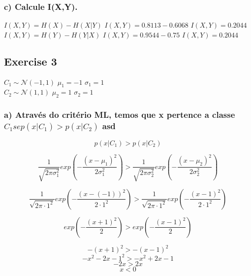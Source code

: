 \documentclass[a4paper]{article}
\begin{document}
\subsubsection{c) Calcule I(X,Y).}

$ I(X,Y) = H(X) - H(X|Y)        $
$ I(X,Y) = 0.8113 - 0.6068      $
$ \boxed{ I(X,Y) = 0.2044 }     $
\\
$ I(X,Y) = H(Y) - H(Y|X)        $
$ I(X,Y) = 0.9544 - 0.75        $
$ \boxed{ I(X,Y) = 0.2044 }     $

\subsection{Exercise 3}

$ C_1\sim\mathcal{N}(-1,1)      $
$ \mu_1 = -1                    $
$ \sigma_1 = 1                  $
\\
$ C_2\sim\mathcal{N}(1,1)       $
$ \mu_2 = 1                     $
$ \sigma_2 = 1                  $

\subsubsection{a) Através do critério ML, temos que x pertence a classe \texorpdfstring{$C_1 se p(x|C_1) > p(x|C_2)$}{C1 se p(x|C1) > p(x|C2)} asd }

$$ p(x|C_1) > p(x|C_2) $$

$$ \frac{1}{\sqrt{2\pi\sigma_1^2}}exp\left(-\frac{(x-\mu_1)^2}{2 \sigma_1^2}\right) > \frac{1}{\sqrt{2\pi\sigma_2^2}}exp\left(-\frac{(x-\mu_2)^2}{2 \sigma_2^2}\right) $$

$$ \frac{1}{\sqrt{2\pi\cdot1^2}}exp\left(-\frac{(x-(-1))^2}{2\cdot1^2}\right) > \frac{1}{\sqrt{2\pi\cdot1^2}}exp\left(-\frac{(x-1)^2}{2\cdot1^2}\right) $$

$$ exp\left(-\frac{(x+1)^2}{2}\right) > exp\left(-\frac{(x-1)^2}{2}\right) $$

$$ -(x+1)^2 > -(x-1)^2      $$
$$ -x^2-2x-1^2 > -x^2+2x-1  $$
$$ -2x > 2x                 $$
$$ \boxed{x < 0}            $$
\end{document}
